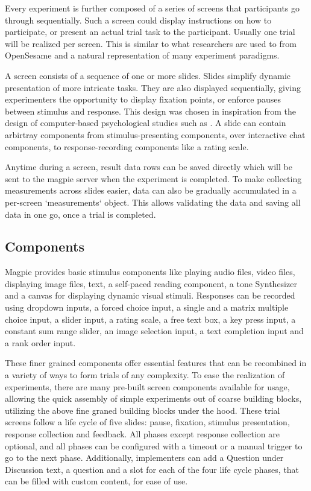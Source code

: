 \documentclass[a4paper,10pt]{paper}
\begin{document}
Every experiment is further composed of a series of screens that participants go through sequentially. Such a screen could display instructions on how to participate, or present an actual trial task to the participant. Usually one trial will be realized per screen. This is similar to what researchers are used to from OpenSesame \citep{Mathot2012} and a natural representation of many experiment paradigms.

A screen consists of a sequence of one or more slides. Slides simplify dynamic presentation of more intricate tasks. They are also displayed sequentially, giving experimenters the opportunity to display fixation points, or enforce pauses between stimulus and response. This design was chosen in inspiration from the design of computer-based psychological studies such as \cite{Todd2004}. A slide can contain arbirtray components from stimulus-presenting components, over interactive chat components, to response-recording components like a rating scale.

Anytime during a screen, result data rows can be saved directly which will be sent to the magpie server when the experiment is completed. To make collecting measurements across slides easier, data can also be gradually accumulated in a per-screen `measurements` object. This allows validating the data and saving all data in one go, once a trial is completed.

\subsection{Components}
Magpie provides basic stimulus components like playing audio files, video files, displaying image files, text, a self-paced reading component, a tone Synthesizer and a canvas for displaying dynamic visual stimuli. Responses can be recorded using dropdown inputs, a forced choice input, a single and a matrix multiple choice input, a slider input, a rating scale, a free text box, a key press input, a constant sum range slider, an image selection input, a text completion input and a rank order input.

These finer grained components offer essential features that can be recombined in a variety of ways to form trials of any complexity.
To ease the realization of experiments, there are many pre-built screen components available for usage, allowing the quick assembly of simple experiments out of coarse building blocks, utilizing the above fine graned building blocks under the hood. These trial screens follow a life cycle of five slides: pause, fixation, stimulus presentation, response collection and feedback. All phases except response collection are optional, and all phases can be configured with a timeout or a manual trigger to go to the next phase. Additionally, implementers can add a Question under Discussion text, a question and a slot for each of the four life cycle phases, that can be filled with custom content, for ease of use.
\end{document}
